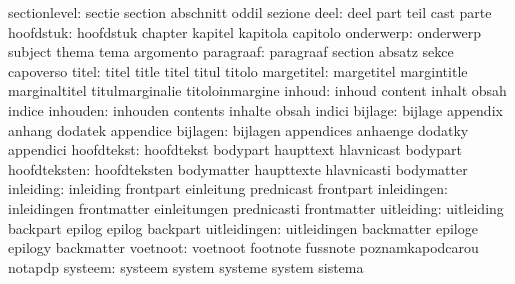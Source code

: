              sectionlevel: sectie                    section
                           abschnitt                 oddil
                           sezione
                     deel: deel                      part
                           teil                      cast
                           parte
                hoofdstuk: hoofdstuk                 chapter
                           kapitel                   kapitola
                           capitolo
                onderwerp: onderwerp                 subject
                           thema                     tema
                           argomento
                paragraaf: paragraaf                 section
                           absatz                    sekce
                           capoverso %
                    titel: titel                     title
                           titel                     titul
                           titolo
               margetitel: margetitel                margintitle
                           marginaltitel             titulmarginalie
                           titoloinmargine
                   inhoud: inhoud                    content
                           inhalt                    obsah
                           indice                    %
                 inhouden: inhouden                  contents
                           inhalte                   obsah
                           indici                    %
                  bijlage: bijlage                   appendix
                           anhang                    dodatek
                           appendice
                 bijlagen: bijlagen                  appendices
                           anhaenge                  dodatky
                           appendici
               hoofdtekst: hoofdtekst                bodypart
                           haupttext                 hlavnicast
                           bodypart                  %
             hoofdteksten: hoofdteksten              bodymatter
                           haupttexte                hlavnicasti
                           bodymatter                %
                inleiding: inleiding                 frontpart
                           einleitung                prednicast
                           frontpart                 %
              inleidingen: inleidingen               frontmatter
                           einleitungen              prednicasti
                           frontmatter               %
               uitleiding: uitleiding                backpart
                           epilog                    epilog
                           backpart                  %
             uitleidingen: uitleidingen              backmatter
                           epiloge                   epilogy
                           backmatter                %
                 voetnoot: voetnoot                  footnote
                           fussnote                  poznamkapodcarou
                           notapdp
                  systeem: systeem                   system
                           systeme                   system
                           sistema

